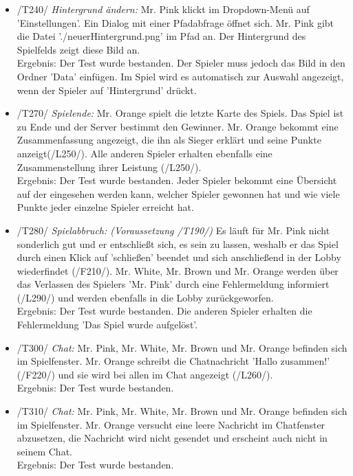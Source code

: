 \documentclass[a4paper]{article}
\begin{document}
\begin{itemize}
\begin{itemize}
		\item /T240/ \textit{Hintergrund ändern:} Mr. Pink klickt im Dropdown-Menü auf 'Einstellungen'. Ein Dialog mit einer 			Pfadabfrage öffnet sich. Mr. Pink gibt die Datei './neuerHintergrund.png' im Pfad an. Der Hintergrund des Spielfelds 			zeigt diese Bild an. \\
		Ergebnis: Der Test wurde bestanden. Der Spieler muss jedoch das Bild in den Ordner 'Data' einfügen. Im Spiel wird 			es automatisch zur Auswahl angezeigt, wenn der Spieler auf 'Hintergrund' drückt.
		
		\item /T270/ \textit{Spielende:} Mr. Orange spielt die letzte Karte des Spiels. Das Spiel ist zu Ende und der 					Server bestimmt den Gewinner. Mr. Orange bekommt eine Zusammenfassung angezeigt, die ihn als Sieger 				erklärt und seine Punkte anzeigt(/L250/). Alle anderen Spieler erhalten ebenfalls eine Zusammenstellung ihrer 				Leistung (/L250/). \\
		Ergebnis: Der Test wurde bestanden. Jeder Spieler bekommt eine Übersicht auf der eingesehen werden kann, 				welcher Spieler gewonnen hat und wie viele Punkte jeder einzelne Spieler erreicht hat.
		
		\item /T280/ \textit{Spielabbruch: (Voraussetzung /T190/)} Es läuft für Mr. Pink nicht sonderlich gut und er 					entschließt sich, es sein zu lassen, weshalb er das Spiel durch einen Klick auf 'schließen' beendet und sich 					anschließend in der Lobby wiederfindet (/F210/). Mr. White, Mr. Brown und Mr. Orange werden über das 				Verlassen des Spielers 'Mr. Pink' durch eine Fehlermeldung informiert (/L290/) und werden ebenfalls in die 					Lobby zurückgeworfen. \\
		Ergebnis: Der Test wurde bestanden. Die anderen Spieler erhalten die Fehlermeldung 'Das Spiel wurde aufgelöst'.
	
		\item /T300/ \textit{Chat:} Mr. Pink, Mr. White, Mr. Brown und Mr. Orange befinden sich im Spielfenster. Mr. Orange 			schreibt die Chatnachricht 'Hallo zusammen!' (/F220/) und sie wird bei allen im Chat angezeigt (/L260/). \\
		Ergebnis: Der Test wurde bestanden.
	
		\item /T310/ \textit{Chat:} Mr. Pink, Mr. White, Mr. Brown und Mr. Orange befinden sich im Spielfenster. Mr. Orange 			versucht eine leere Nachricht im Chatfenster abzusetzen, die Nachricht wird nicht gesendet und erscheint auch 				nicht in seinem Chat. \\
		Ergebnis: Der Test wurde bestanden.
		

\end{itemize}
\end{itemize}
\end{document}
